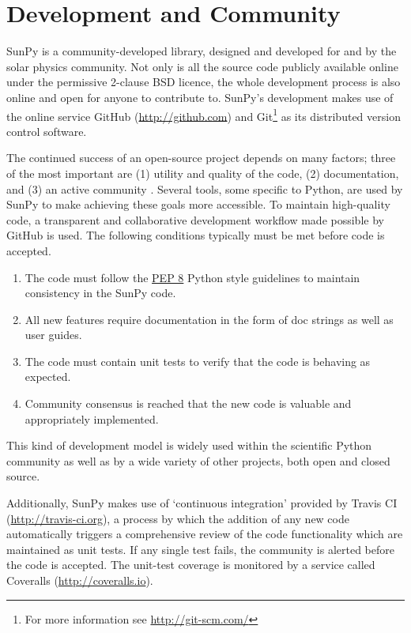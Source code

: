 \section{Development and Community}\label{sec:dev}
SunPy is a community-developed library, designed and developed for and by 
the solar physics community. Not only is all the source code publicly available 
online under the permissive 2-clause BSD licence, the whole 
development process is also online and open for anyone to contribute to.
SunPy's development makes use of the online service 
GitHub (\url{http://github.com}) and Git\footnote{For more information see \url{http://git-scm.com/}}
as its distributed version control software. 

The continued success of an open-source project depends on many factors;
three of the most important are (1) utility and quality of the code, (2) documentation, and (3) an
active community \citep{bangerth2013}. Several tools, some specific to Python, are used by
SunPy to make achieving these goals more accessible. To maintain high-quality code, a 
transparent and collaborative development workflow made possible by GitHub is used.
The following conditions typically must be met before code is accepted.
\begin{enumerate}
	\item  The code must follow the
	\href{http://www.python.org/dev/peps/pep-0008/}{PEP 8} Python style 
	guidelines to maintain consistency in the SunPy code.
	
	\item All new features require documentation in the form of doc strings as well as user
	guides. 
	
	\item The code must contain unit tests to verify that the code is behaving 
	as expected.

    \item Community consensus is reached that the new code is valuable and appropriately implemented.
\end{enumerate}
This kind of development model is widely used within the scientific Python 
community as well as by a wide variety of other projects, both open and closed 
source. 

Additionally, SunPy makes use of `continuous integration' provided by Travis CI (\url{http://travis-ci.org}), a process by which the addition of any new code 
automatically triggers a comprehensive review of the code functionality which are maintained as unit tests.
 If any single test
fails, the community is alerted before the code is accepted. The unit-test coverage is monitored by
a service called Coveralls (\url{http://coveralls.io}).

